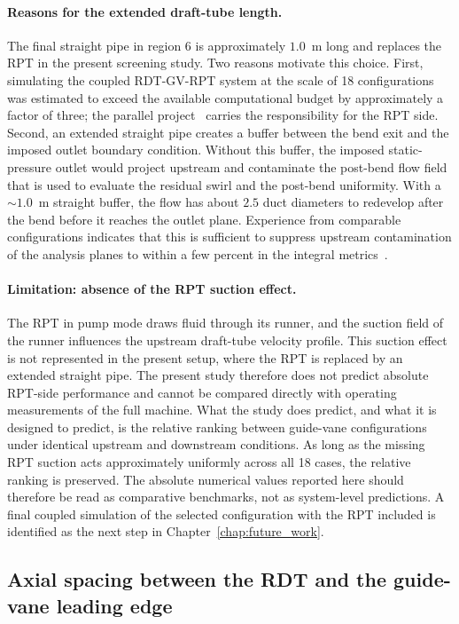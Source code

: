 \paragraph{Reasons for the extended draft-tube length.}
The final straight pipe in region 6 is approximately $1.0$~m long and replaces the RPT in the present screening study. Two reasons motivate this choice. First, simulating the coupled RDT-GV-RPT system at the scale of 18 configurations was estimated to exceed the available computational budget by approximately a factor of three; the parallel project~\cite{Dokset2025} carries the responsibility for the RPT side. Second, an extended straight pipe creates a buffer between the bend exit and the imposed outlet boundary condition. Without this buffer, the imposed static-pressure outlet would project upstream and contaminate the post-bend flow field that is used to evaluate the residual swirl and the post-bend uniformity. With a $\sim 1.0$~m straight buffer, the flow has about $2.5$ duct diameters to redevelop after the bend before it reaches the outlet plane. Experience from comparable configurations indicates that this is sufficient to suppress upstream contamination of the analysis planes to within a few percent in the integral metrics~\cite{Xia1997}.
 
\paragraph{Limitation: absence of the RPT suction effect.}
The RPT in pump mode draws fluid through its runner, and the suction field of the runner influences the upstream draft-tube velocity profile. This suction effect is not represented in the present setup, where the RPT is replaced by an extended straight pipe. The present study therefore does not predict absolute RPT-side performance and cannot be compared directly with operating measurements of the full machine. What the study does predict, and what it is designed to predict, is the relative ranking between guide-vane configurations under identical upstream and downstream conditions. As long as the missing RPT suction acts approximately uniformly across all 18 cases, the relative ranking is preserved. The absolute numerical values reported here should therefore be read as comparative benchmarks, not as system-level predictions. A final coupled simulation of the selected configuration with the RPT included is identified as the next step in Chapter~\ref{chap:future_work}.

\subsection{Axial spacing between the RDT and the guide-vane leading edge}
\label{sec:methods_axial_spacing}

